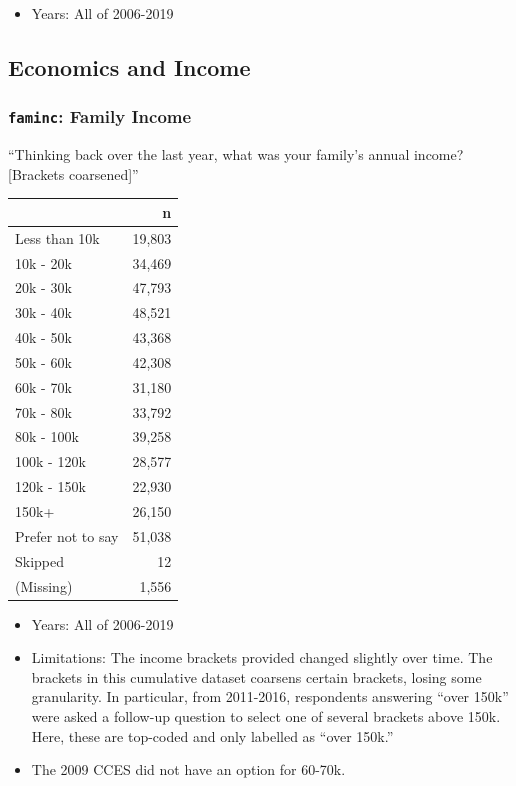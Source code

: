 \documentclass[10pt,article,oneside]{memoir}
\theoremstyle{definition}
\begin{document}
\begin{itemize}
\tightlist
\item
  Years: All of 2006-2019
\end{itemize}

\hypertarget{economics-and-income}{%
\subsection{Economics and Income}\label{economics-and-income}}

\hypertarget{faminc-family-income}{%
\subsubsection{\texorpdfstring{\texttt{faminc}: Family
Income}{faminc: Family Income}}\label{faminc-family-income}}

``Thinking back over the last year, what was your family's annual
income? {[}Brackets coarsened{]}''

\begin{table}[H]
\centering
\begin{tabular}{lr}
\toprule
 & n\\
\midrule
Less than 10k & 19,803\\
10k - 20k & 34,469\\
20k - 30k & 47,793\\
30k - 40k & 48,521\\
40k - 50k & 43,368\\
50k - 60k & 42,308\\
60k - 70k & 31,180\\
70k - 80k & 33,792\\
80k - 100k & 39,258\\
100k - 120k & 28,577\\
120k - 150k & 22,930\\
150k+ & 26,150\\
Prefer not to say & 51,038\\
Skipped & 12\\
(Missing) & 1,556\\
\bottomrule
\end{tabular}
\end{table}

\begin{itemize}
\tightlist
\item
  Years: All of 2006-2019
\item
  Limitations: The income brackets provided changed slightly over time.
  The brackets in this cumulative dataset coarsens certain brackets,
  losing some granularity. In particular, from 2011-2016, respondents
  answering ``over 150k'' were asked a follow-up question to select one
  of several brackets above 150k. Here, these are top-coded and only
  labelled as ``over 150k.''
\item
  The 2009 CCES did not have an option for 60-70k.
\end{itemize}
\end{document}
